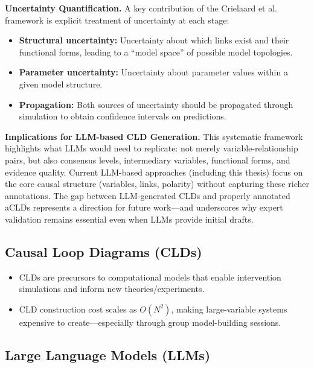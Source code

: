 \documentclass[12pt]{article}
\begin{document}
\medskip
\noindent
\textbf{Uncertainty Quantification.} A key contribution of the Crielaard et al. framework is explicit treatment of uncertainty at each stage:
\begin{itemize}
    \item \textbf{Structural uncertainty:} Uncertainty about which links exist and their functional forms, leading to a ``model space'' of possible model topologies.
    \item \textbf{Parameter uncertainty:} Uncertainty about parameter values within a given model structure.
    \item \textbf{Propagation:} Both sources of uncertainty should be propagated through simulation to obtain confidence intervals on predictions.
\end{itemize}

\medskip
\noindent
\textbf{Implications for LLM-based CLD Generation.} This systematic framework highlights what LLMs would need to replicate: not merely variable-relationship pairs, but also consensus levels, intermediary variables, functional forms, and evidence quality. Current LLM-based approaches (including this thesis) focus on the core causal structure (variables, links, polarity) without capturing these richer annotations. The gap between LLM-generated CLDs and properly annotated aCLDs represents a direction for future work---and underscores why expert validation remains essential even when LLMs provide initial drafts.

\subsection{Causal Loop Diagrams (CLDs)}

\begin{itemize}
    \item CLDs are precursors to computational models that enable intervention simulations and inform new theories/experiments.
    \item CLD construction cost scales as $O(N^2)$, making large-variable systems expensive to create---especially through group model-building sessions.
\end{itemize}

\subsection{Large Language Models (LLMs)}
\end{document}
